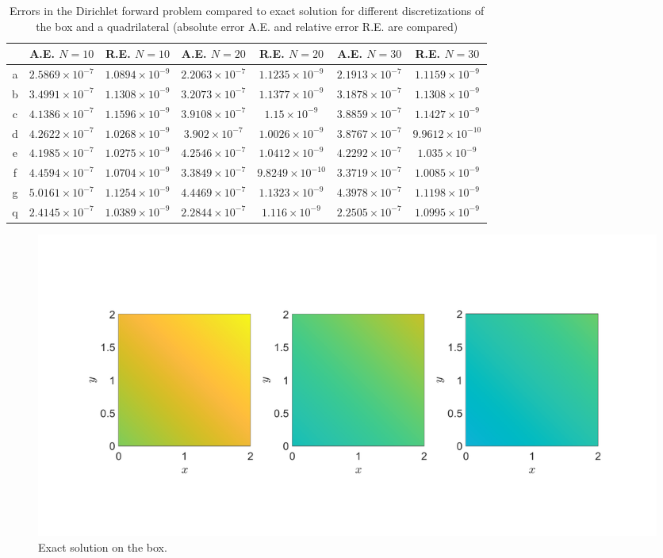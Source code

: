 \documentclass[11pt, a4paper]{article}
\theoremstyle{definition}
\begin{document}
\begin{table}
	\begin{tabular}{ ||c| c| c| c| c |c|c|| }
		\hline
		\hline
		& A.E. $N =10$ & R.E. $N =10$ &A.E. $N =20$ & R.E. $N =20$ &A.E. $N =30$ & R.E. $N =30$ \\ 
		\hline
		a & $2.5869 \times 10^{-7}$ & $1.0894 \times 10^{-9}$ & $2.2063 \times 10^{-7}$ & $1.1235 \times 10^{-9}$ & $2.1913 \times 10^{-7}$ & $1.1159 \times 10^{-9}$ \\  
		b & $3.4991\times 10^{-7}$ & $1.1308 \times 10^{-9}$ &  $3.2073 \times 10^{-7}$ & $1.1377 \times 10^{-9}$  & $3.1878 \times 10^{-7}$ & $1.1308 \times 10^{-9}$\\  
		c & $4.1386\times 10^{-7}$  & $1.1596 \times 10^{-9}$ & $3.9108\times 10^{-7}$ & $1.15 \times 10^{-9}$  & $3.8859\times 10^{-7}$ & $1.1427\times 10^{-9}$ \\  
		d & $4.2622\times 10^{-7}$ & $1.0268 \times 10^{-9} $& $3.902\times 10^{-7}$ & $1.0026 \times 10^{-9}$ & $3.8767\times 10^{-7}$ & $9.9612 \times 10^{-10}$\\
		e & $4.1985 \times 10^{-7}$ & $1.0275 \times 10^{-9}$  & $4.2546 \times 10^{-7}$ & $1.0412 \times 10^{-9}$  & $4.2292 \times 10^{-7}$  & $1.035 \times 10^{-9}$ \\
		f & $4.4594 \times 10^{-7}$  & $1.0704 \times 10^{-9}$ & $3.3849 \times 10^{-7}$ & $9.8249 \times 10^{-10}$&  $3.3719 \times 10^{-7}$&  $1.0085 \times 10^{-9}$\\
		g & $5.0161\times 10^{-7}$ & $1.1254 \times 10^{-9}$  & $4.4469\times 10^{-7}$& $1.1323 \times 10^{-9}$ &  $4.3978\times 10^{-7}$& $1.1198\times 10^{-9}$\\
		q & $2.4145\times 10^{-7}$ & $1.0389\times 10^{-9}$ & $2.2844\times 10^{-7}$ & $1.116\times 10^{-9}$ & $2.2505\times 10^{-7}$ & $1.0995\times 10^{-9}$\\
		\hline
		\hline
	\end{tabular}
	\caption{Errors in the Dirichlet forward problem compared to exact solution for different discretizations of the box and a quadrilateral (absolute error A.E. and relative error R.E. are compared)}
	\label{Tab1:ErrorsExBox}
\end{table}

	\begin{figure}[h]
		\centering
		\includegraphics[scale=0.35]{boxEx.png}
		\caption{Exact solution on the box.} 
		\label{F3}
	\end{figure}
\end{document}
